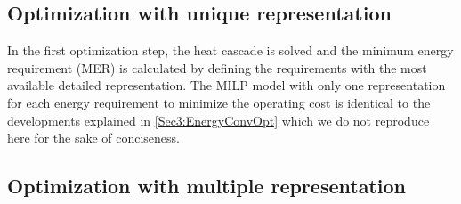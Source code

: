
\subsection{Optimization with unique representation}
\label{sec:retrofitoptunique}
In the first optimization step, the heat cascade is solved and the minimum energy requirement (MER) is calculated by defining the requirements with the most available detailed representation. The MILP model with only one representation for each energy requirement to minimize the operating cost is identical to the developments explained in \cref{Sec3:EnergyConvOpt} which we do not reproduce here for the sake of conciseness. 

\subsection{Optimization with multiple representation}
\label{sec6:multipleMILP}

